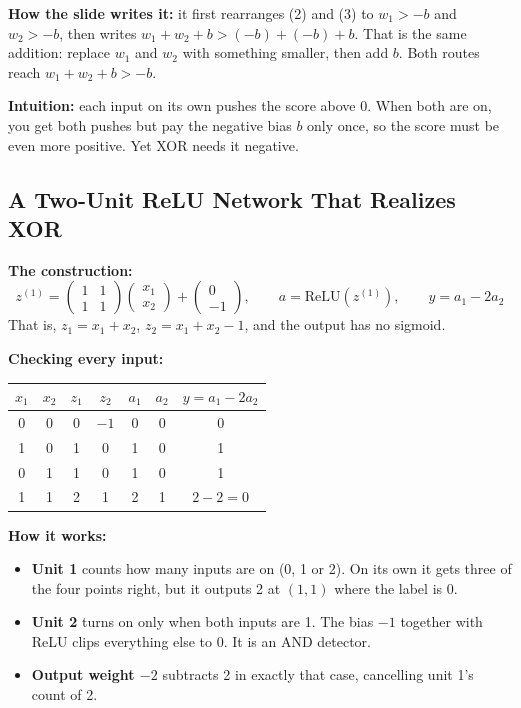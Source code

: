 \textbf{How the slide writes it:} it first rearranges (2) and (3) to $w_1 > -b$ and $w_2 > -b$, then writes $w_1 + w_2 + b > (-b) + (-b) + b$. That is the same addition: replace $w_1$ and $w_2$ with something smaller, then add $b$. Both routes reach $w_1 + w_2 + b > -b$.

\textbf{Intuition:} each input on its own pushes the score above 0. When both are on, you get both pushes but pay the negative bias $b$ only once, so the score must be even more positive. Yet XOR needs it negative.


\subsection*{A Two-Unit ReLU Network That Realizes XOR}

\textbf{The construction:}
\[
z^{(1)} = \begin{pmatrix} 1 & 1 \\ 1 & 1 \end{pmatrix} \begin{pmatrix} x_1 \\ x_2 \end{pmatrix} + \begin{pmatrix} 0 \\ -1 \end{pmatrix}, \qquad a = \mathrm{ReLU}(z^{(1)}), \qquad y = a_1 - 2a_2
\]
That is, $z_1 = x_1 + x_2$, $z_2 = x_1 + x_2 - 1$, and the output has no sigmoid.

\textbf{Checking every input:}
\begin{center}
\begin{tabular}{ccccccc}
\toprule
$x_1$ & $x_2$ & $z_1$ & $z_2$ & $a_1$ & $a_2$ & $y = a_1 - 2a_2$ \\
\midrule
0 & 0 & 0 & $-1$ & 0 & 0 & 0 \\
1 & 0 & 1 & 0 & 1 & 0 & 1 \\
0 & 1 & 1 & 0 & 1 & 0 & 1 \\
1 & 1 & 2 & 1 & 2 & 1 & $2 - 2 = 0$ \\
\bottomrule
\end{tabular}
\end{center}

\textbf{How it works:}
\begin{itemize}
  \item \textbf{Unit 1} counts how many inputs are on (0, 1 or 2). On its own it gets three of the four points right, but it outputs 2 at $(1,1)$ where the label is 0.
  \item \textbf{Unit 2} turns on only when both inputs are 1. The bias $-1$ together with ReLU clips everything else to 0. It is an AND detector.
  \item \textbf{Output weight $-2$} subtracts 2 in exactly that case, cancelling unit 1's count of 2.
\end{itemize}

